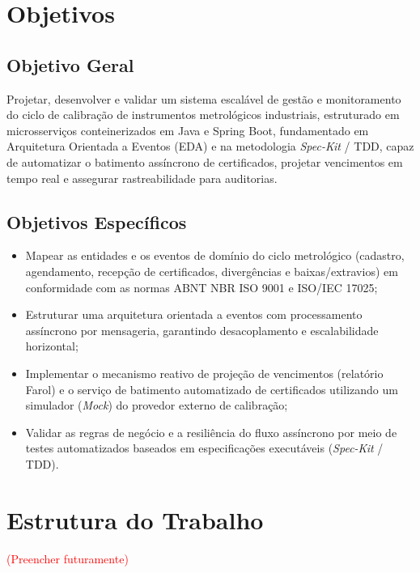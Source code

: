 \section{Objetivos}

\subsection{Objetivo Geral}

Projetar, desenvolver e validar um sistema escalável de gestão e monitoramento do ciclo de calibração de instrumentos metrológicos industriais, estruturado em microsserviços conteinerizados em Java e Spring Boot, fundamentado em Arquitetura Orientada a Eventos (EDA) e na metodologia \textit{Spec-Kit} / TDD, capaz de automatizar o batimento assíncrono de certificados, projetar vencimentos em tempo real e assegurar rastreabilidade para auditorias.

\subsection{Objetivos Específicos}

\begin{itemize}
    \item Mapear as entidades e os eventos de domínio do ciclo metrológico (cadastro, agendamento, recepção de certificados, divergências e baixas/extravios) em conformidade com as normas ABNT NBR ISO 9001 e ISO/IEC 17025;
    \item Estruturar uma arquitetura orientada a eventos com processamento assíncrono por mensageria, garantindo desacoplamento e escalabilidade horizontal;
    \item Implementar o mecanismo reativo de projeção de vencimentos (relatório Farol) e o serviço de batimento automatizado de certificados utilizando um simulador (\textit{Mock}) do provedor externo de calibração;
    \item Validar as regras de negócio e a resiliência do fluxo assíncrono por meio de testes automatizados baseados em especificações executáveis (\textit{Spec-Kit} / TDD).
\end{itemize}

\section{Estrutura do Trabalho}

\textcolor{red}{(Preencher futuramente)}
